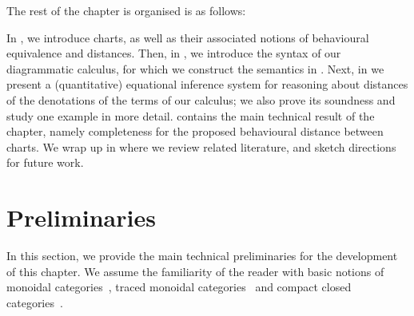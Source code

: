 


The rest of the chapter is organised is as follows:

In , we introduce charts, as well as their associated notions of behavioural equivalence and distances. Then, in , we introduce the syntax of our diagrammatic calculus, for which we construct the semantics in . Next, in  we present a (quantitative) equational inference system for reasoning about distances of the denotations of the terms of our calculus; we also prove its soundness and study one example in more detail.  contains the main technical result of the chapter, namely completeness for the proposed behavioural distance between charts. We wrap up in  where we review related literature, and sketch directions for future work.  

\section{Preliminaries}\label{c3:sec:preliminaries}
In this section, we provide the main technical preliminaries for the development of this chapter. We assume the familiarity of the reader with basic notions of monoidal categories~\cite{Selinger_2010,piedeleu2023introduction}, traced monoidal categories~\cite{Joyal:1996:Traced} and compact closed categories~\cite{kellylaplaza}.

